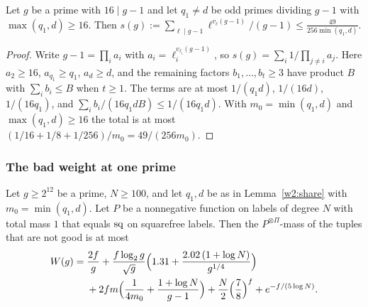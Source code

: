 \begin{lemma}\label{w2:share}
Let $g$ be a prime with $16\mid g-1$ and let $q_1\ne d$ be odd primes dividing $g-1$ with $\max(q_1,d)\ge16$. Then $s(g):=\sum_{\ell\mid g-1}\ell^{v_\ell(g-1)}/(g-1)\le\frac{49}{256\min(q_1,d)}$.
\end{lemma}

\begin{proof}
Write $g-1=\prod_ia_i$ with $a_i=\ell_i^{v_{\ell_i}(g-1)}$, so $s(g)=\sum_i1/\prod_{j\ne i}a_j$. Here $a_2\ge16$, $a_{q_1}\ge q_1$, $a_d\ge d$, and the remaining factors $b_1,\dots,b_t\ge3$ have product $B$ with $\sum_ib_i\le B$ when $t\ge1$. The terms are at most $1/(q_1d)$, $1/(16d)$, $1/(16q_1)$, and $\sum_ib_i/(16q_1dB)\le1/(16q_1d)$. With $m_0=\min(q_1,d)$ and $\max(q_1,d)\ge16$ the total is at most $(1/16+1/8+1/256)/m_0=49/(256m_0)$.
\end{proof}

\subsubsection{The bad weight at one prime}

\begin{theorem}\label{w2:badweight}
Let $g\ge2^{12}$ be a prime, $N\ge100$, and let $q_1,d$ be as in Lemma~\ref{w2:share} with $m_0=\min(q_1,d)$. Let $P$ be a nonnegative function on labels of degree $N$ with total mass $1$ that equals $\mathrm{sq}$ on squarefree labels. Then the $P^{\otimes\Pi}$-mass of the tuples that are not good is at most
\[
\begin{aligned}
W(g)={}&\frac{2f}{g}+\frac{f\log_2g}{\sqrt g}\Bigl(1.31+\frac{2.02\,(1+\log N)}{g^{1/4}}\Bigr)\\
&+2fm\Bigl(\frac1{4m_0}+\frac{1+\log N}{g-1}\Bigr)+\frac N2\Bigl(\frac78\Bigr)^f+e^{-f/(5\log N)}.
\end{aligned}
\]
\end{theorem}

